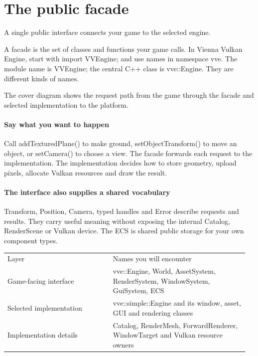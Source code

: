 \documentclass[11pt,a4paper]{article}
\begin{document}
\clearpage\part{The public facade}
\label{core-4}
A single public interface connects your game to the selected engine.

A facade is the set of classes and functions your game calls. In Vienna Vulkan Engine, start with import VVEngine; and use names in namespace vve. The module name is VVEngine; the central C++ class is vve::Engine. They are different kinds of names.

The cover diagram shows the request path from the game through the facade and selected implementation to the platform.

\subsection*{Say what you want to happen}
Call addTexturedPlane() to make ground, setObjectTransform() to move an object, or setCamera() to choose a view. The facade forwards each request to the implementation. The implementation decides how to store geometry, upload pixels, allocate Vulkan resources and draw the result.

\subsection*{The interface also supplies a shared vocabulary}
Transform, Position, Camera, typed handles and Error describe requests and results. They carry useful meaning without exposing the internal Catalog, RenderScene or Vulkan device. The ECS is shared public storage for your own component types.

{\small
\begin{longtable}{@{}p{0.42\linewidth}p{0.54\linewidth}@{}}
Layer & Names you will encounter \\
Game-facing interface & vve::Engine, World, AssetSystem, RenderSystem, WindowSystem, GuiSystem, ECS \\
Selected implementation & vve::simple::Engine and its window, asset, GUI and rendering classes \\
Implementation details & Catalog, RenderMesh, ForwardRenderer, WindowTarget and Vulkan resource owners \\
\end{longtable}
}
\end{document}
